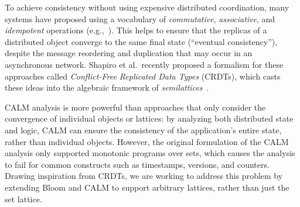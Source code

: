 
To achieve consistency without using expensive distributed coordination, many
systems have proposed using a vocabulary of \emph{commutative},
\emph{associative}, and \emph{idempotent} operations
(e.g.,~\cite{dynamo,Reiher1994,bayou,quicksand}). This helps to ensure that the
replicas of a distributed object converge to the same final state (``eventual
consistency''), despite the message reordering and duplication that may occur in
an asynchronous network. Shapiro et al.\ recently proposed a formalism for these
approaches called \emph{Conflict-Free Replicated Data Types} (CRDTs), which
casts these ideas into the algebraic framework of
\emph{semilattices}~\cite{Shapiro2011a,Shapiro2011b}.

CALM analysis is more powerful than approaches that only consider the
convergence of individual objects or lattices: by analyzing both distributed
state and logic, CALM can ensure the consistency of the application's entire
state, rather than individual objects. However, the original formulation of the
CALM analysis only supported monotonic programs over sets, which causes the
analysis to fail for common constructs such as timestamps, versions, and
counters. Drawing inspiration from CRDTs, we are working to address this problem
by extending Bloom and CALM to support arbitrary lattices, rather than just the
set lattice.

